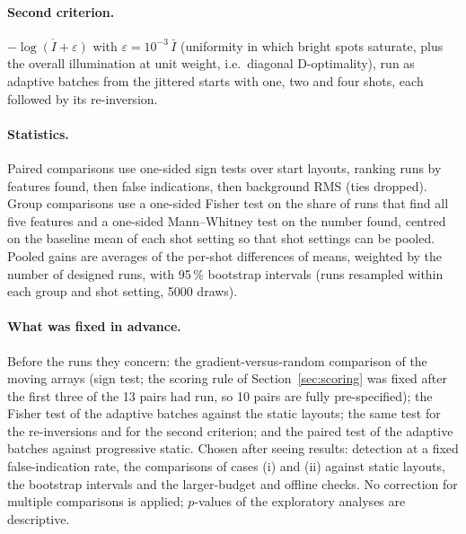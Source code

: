 \paragraph{Second criterion.} $-\overline{\log(I+\varepsilon)}$ with $\varepsilon=10^{-3}\,\bar I$ (uniformity in which
bright spots saturate, plus the overall illumination at unit weight, i.e.\ diagonal D-optimality), run as adaptive
batches from the jittered starts with one, two and four shots, each followed by its re-inversion.

\paragraph{Statistics.} Paired comparisons use one-sided sign tests over start layouts, ranking runs by features
found, then false indications, then background RMS (ties dropped). Group comparisons use a one-sided Fisher test on the
share of runs that find all five features and a one-sided Mann--Whitney test on the number found, centred on the
baseline mean of each shot setting so that shot settings can be pooled. Pooled gains are averages of the per-shot
differences of means, weighted by the number of designed runs, with 95\,\% bootstrap intervals (runs resampled within
each group and shot setting, 5000 draws).

\paragraph{What was fixed in advance.} Before the runs they concern: the gradient-versus-random comparison of the
moving arrays (sign test; the scoring rule of Section~\ref{sec:scoring} was fixed after the first three of the 13
pairs had run, so 10 pairs are fully pre-specified); the Fisher test of the adaptive batches against the static
layouts; the same test for the re-inversions and for the second criterion; and the paired test of the adaptive
batches against progressive static. Chosen after seeing results: detection at a fixed false-indication rate, the
comparisons of cases (i) and (ii) against static layouts, the bootstrap intervals and the larger-budget and offline
checks. No correction for multiple comparisons is applied; $p$-values of the exploratory analyses are descriptive.
